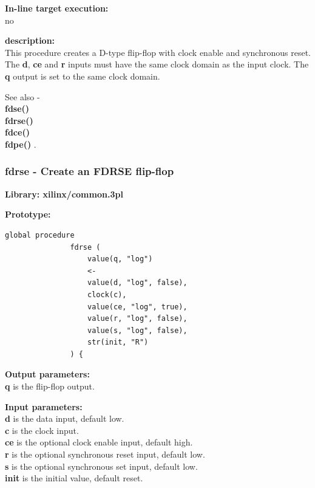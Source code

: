             {\bf In-line target execution:} \\
            no

            {\bf description:} \\
            This procedure creates a D-type flip-flop with clock enable and
            synchronous reset. The {\bf d}, {\bf ce} and {\bf r} inputs must
            have the same clock domain as the input clock. The {\bf q} output
            is set to the same clock domain.
            
            See also - \\
            {\bf fdse()} \\
            {\bf fdrse()} \\
            {\bf fdce()} \\
            {\bf fdpe()} .


        \subsubsection{fdrse - Create an FDRSE flip-flop}\label{sec:lpfdrse}
            
            {\bf Library: xilinx/common.3pl}

            {\bf Prototype:} \\
            \vsp
            \begin{lstlisting}[gobble=12, language=threepl]
               global procedure
               fdrse (
                   value(q, "log")
                   <-
                   value(d, "log", false),
                   clock(c),
                   value(ce, "log", true),
                   value(r, "log", false),
                   value(s, "log", false),
                   str(init, "R")
               ) {
            \end{lstlisting}

            {\bf Output parameters:} \\
            {\bf q} is the flip-flop output.

            {\bf Input parameters:} \\            
            {\bf d} is the data input, default low.\\
            {\bf c} is the clock input.\\
            {\bf ce} is the optional clock enable input, default high.\\
            {\bf r} is the optional synchronous reset input, default low. \\
            {\bf s} is the optional synchronous set input, default low. \\
            {\bf init} is the initial value, default reset.
        
